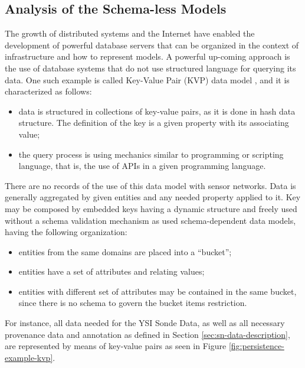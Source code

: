 \newpage

\subsection{Analysis of the Schema-less Models}

The growth of distributed systems and the Internet have enabled the development
of powerful database servers that can be organized in the context of
infrastructure and how to represent models. A powerful up-coming approach is
the use of database systems that do not use structured language for querying
its data. One such example is called Key-Value Pair (KVP) data model
\cite{db-kvp}, and it is characterized as follows:

\begin{itemize}
  \item data is structured in collections of key-value pairs, as it is done in
  hash data structure. The definition of the key is a given property with its
  associating value;
  \item the query process is using mechanics similar to programming or
  scripting language, that is, the use of APIs in a given programming language.
\end{itemize}

There are no records of the use of this data model with sensor networks. Data
is generally aggregated by given entities and any needed property applied to
it. Key may be composed by embedded keys having a dynamic structure and freely
used without a schema validation mechanism as used schema-dependent data
models, having the following organization:

\begin{itemize}
  \item entities from the same domains are placed into a ``bucket'';
  \item entities have a set of attributes and relating values;
  \item entities with different set of attributes may be contained in the same
  bucket, since there is no schema to govern the bucket items restriction.
\end{itemize}

For instance, all data needed for the YSI Sonde Data, as well as all necessary
provenance data and annotation as defined in Section
\ref{sec:sn-data-description}, are represented by means of key-value pairs as
seen in Figure \ref{fig:persistence-example-kvp}.

